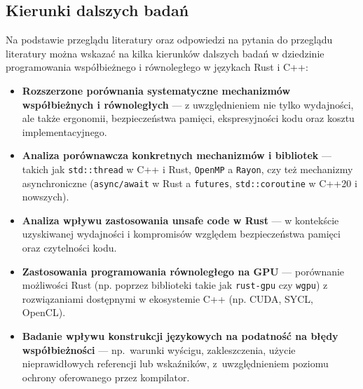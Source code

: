 \subsection{Kierunki dalszych badań}
Na podstawie przeglądu literatury oraz odpowiedzi na pytania do przeglądu literatury można wskazać na kilka kierunków dalszych badań w dziedzinie programowania współbieżnego i równoległego w językach Rust i C++:
\begin{itemize}
    \item \textbf{Rozszerzone porównania systematyczne mechanizmów współbieżnych i równoległych} — z uwzględnieniem nie tylko wydajności, ale także ergonomii, bezpieczeństwa pamięci, ekspresyjności kodu oraz kosztu implementacyjnego.
    \item \textbf{Analiza porównawcza konkretnych mechanizmów i bibliotek} — takich jak \texttt{std::thread} w C++ i Rust, \texttt{OpenMP} a \texttt{Rayon}, czy też mechanizmy asynchroniczne (\texttt{async/await} w Rust a \texttt{futures}, \texttt{std::coroutine} w C++20 i nowszych).
    \item \textbf{Analiza wpływu zastosowania unsafe code w Rust} — w kontekście uzyskiwanej wydajności i kompromisów względem bezpieczeństwa pamięci oraz czytelności kodu.
    \item \textbf{Zastosowania programowania równoległego na GPU} — porównanie możliwości Rust (np. poprzez biblioteki takie jak \texttt{rust-gpu} czy \texttt{wgpu}) z rozwiązaniami dostępnymi w ekosystemie C++ (np. CUDA, SYCL, OpenCL).
    \item \textbf{Badanie wpływu konstrukcji językowych na podatność na błędy współbieżności} — \mbox{np. warunki} wyścigu, zakleszczenia, użycie nieprawidłowych referencji lub wskaźników, z~uwzględnieniem poziomu ochrony oferowanego przez kompilator.
\end{itemize}
